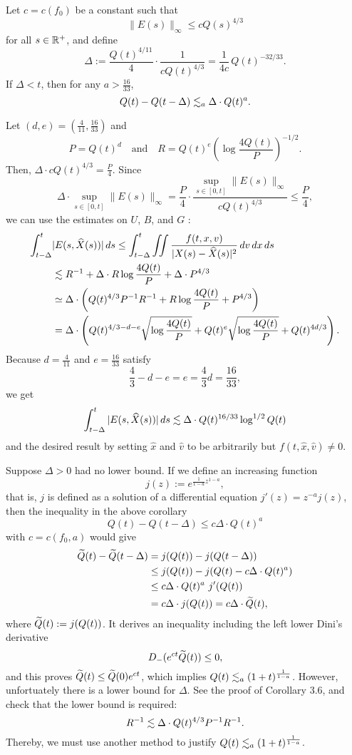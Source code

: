 \documentclass[11pt]{amsart}
\begin{document}
\begin{cor}
Let $c=c(f_0)$ be a constant such that
\[\|E(s)\|_\infty\le cQ(s)^{4/3}\]
for all $s\in\mathbb{R}^+$, and define
\[\Delta:=\frac{Q(t)^{4/11}}4\cdot\frac1{cQ(t)^{4/3}}=\frac1{4c}\,Q(t)^{-32/33}.\]
If $\Delta<t$, then for any $a>\frac{16}{33}$,
\[Q(t)-Q(t-\Delta)\lesssim_a\Delta\cdot Q(t)^a.\]
\end{cor}
\begin{pf}
Let $(d,e)=(\frac4{11},\frac{16}{33})$ and
\[P=Q(t)^d\quad\text{and}\quad R=Q(t)^e(\log\frac{4Q(t)}P)^{-1/2}.\]
Then, $\Delta\cdot cQ(t)^{4/3}=\frac P4$.
Since
\[\Delta\cdot\sup_{s\in[0,t]}\|E(s)\|_\infty=\frac P4\cdot\frac{\sup_{s\in[0,t]}\|E(s)\|_\infty}{cQ(t)^{4/3}}\le\frac P4,\]
we can use the estimates on $U$, $B$, and $G$ :
\begin{align*}
\int_{t-\Delta}^t&|E(s,\widehat X(s))|\,ds
\le\int_{t-\Delta}^t\iint\frac{f(t,x,v)}{|X(s)-\widehat X(s)|^2}\,dv\,dx\,ds\\
&\lesssim R^{-1}+\Delta\cdot R\log\frac{4Q(t)}P+\Delta\cdot P^{4/3}\\
&\simeq\Delta\cdot\left(Q(t)^{4/3}P^{-1}R^{-1}+R\log\frac{4Q(t)}P+P^{4/3}\right)\\
&=\Delta\cdot\left(Q(t)^{4/3-d-e}\sqrt{\log\frac{4Q(t)}P}+Q(t)^e\sqrt{\log\frac{4Q(t)}P}+Q(t)^{4d/3}\right).
\end{align*}
Because $d=\frac4{11}$ and $e=\frac{16}{33}$ satisfy
\[\frac43-d-e=e=\frac43d=\frac{16}{33},\]
we get
\[\int_{t-\Delta}^t|E(s,\widehat X(s))|\,ds\lesssim\Delta\cdot Q(t)^{16/33}\log^{1/2}Q(t)\]
and the desired result by setting $\hat x$ and $\hat v$ to be arbitrarily but $f(t,\hat x,\hat v)\ne0$.
\end{pf}
\begin{rmk}
Suppose $\Delta>0$ had no lower bound.
If we define an increasing function
\[j(z):=e^{\frac1{1-a}z^{1-a}},\]
that is, $j$ is defined as a solution of a differential equation $j'(z)=z^{-a}j(z)$, then the inequality in the above corollary
\[Q(t)-Q(t-\Delta)\le c\Delta\cdot Q(t)^a\]
with $c=c(f_0,a)$ would give
\begin{align*}
\widetilde Q(t)-\widetilde Q(t-\Delta)
&=j(Q(t))-j(Q(t-\Delta))\\
&\le j(Q(t))-j(Q(t)-c\Delta\cdot Q(t)^a)\\
&\le c\Delta\cdot Q(t)^a\ j'(Q(t))\\
&=c\Delta\cdot j(Q(t))=c\Delta\cdot\widetilde Q(t),
\end{align*}
where $\widetilde Q(t):=j(Q(t))$.
It derives an inequality including the left lower Dini's derivative
\[D_-(e^{ct}\widetilde Q(t))\le0,\]
and this proves $\widetilde Q(t)\le\widetilde Q(0)e^{ct}$, which implies $Q(t)\lesssim_a(1+t)^{\frac1{1-a}}$.
However, unfortuately there is a lower bound for $\Delta$.
See the proof of Corollary 3.6, and check that the lower bound is required:
\[R^{-1}\lesssim\Delta\cdot Q(t)^{4/3}P^{-1}R^{-1}.\]
Thereby, we must use another method to justify $Q(t)\lesssim_a(1+t)^{\frac1{1-a}}$.
\end{rmk}
\end{document}

